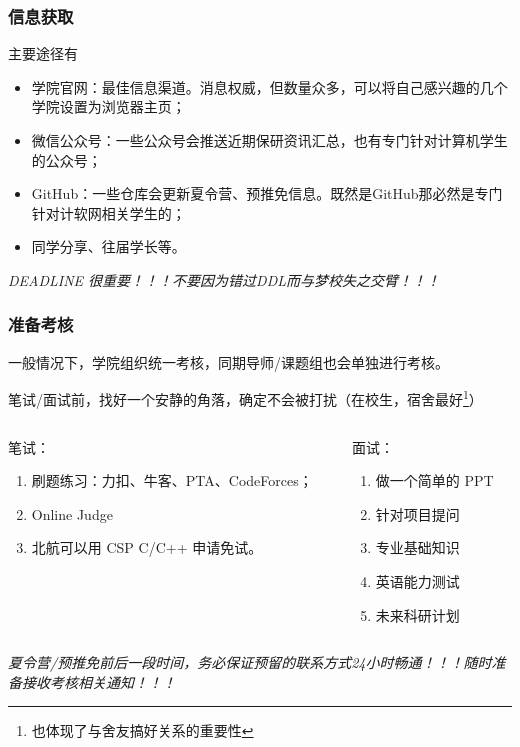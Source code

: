 \begin{frame}
	\frametitle{信息获取}

	主要途径有
	\begin{itemize}
		\item 学院官网：最佳信息渠道。消息权威，但数量众多，可以将自己感兴趣的几个学院设置为浏览器主页；
		\item 微信公众号：一些公众号会推送近期保研资讯汇总，也有专门针对计算机学生的公众号；
		\item GitHub：一些仓库会更新夏令营、预推免信息。既然是GitHub那必然是专门针对计软网相关学生的；
		\item 同学分享、往届学长等。
	\end{itemize}

	\emph{DEADLINE 很重要！！！不要因为错过DDL而与梦校失之交臂！！！}

\end{frame}

\begin{frame}
	\frametitle{准备考核}


	一般情况下，学院组织统一考核，同期导师/课题组也会单独进行考核。

	笔试/面试前，找好一个安静的角落，确定不会被打扰（在校生，宿舍最好\footnote{也体现了与舍友搞好关系的重要性}）

	\begin{center}
		\begin{columns}
			\begin{column}{0.4\linewidth}
				笔试：
				\begin{enumerate}
					\item 刷题练习：力扣、牛客、PTA、CodeForces；
					\item Online Judge
					\item 北航可以用 CSP C/C++ 申请免试。
				\end{enumerate}
			\end{column}

			\begin{column}{0.4\linewidth}
				面试：
				\begin{enumerate}
					\item 做一个简单的 PPT
					\item 针对项目提问
					\item 专业基础知识
					\item 英语能力测试
					\item 未来科研计划
				\end{enumerate}
			\end{column}
		\end{columns}
	\end{center}
	\emph{夏令营/预推免前后一段时间，务必保证预留的联系方式24小时畅通！！！随时准备接收考核相关通知！！！}
\end{frame}

